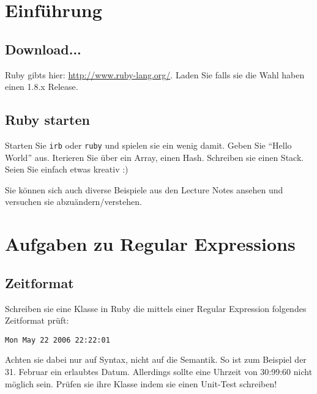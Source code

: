 \documentclass[a4paper,11pt,oneside]{scrbook}
\begin{document}
\renewcommand{\theequation}{\thesection.\arabic}
\setcapindent*{1em}


\chapter{Einführung} %
\label{cha:einführung}
\section{Download...} %
\label{sec:download_}
Ruby gibts hier: \url{http://www.ruby-lang.org/}. Laden Sie falls sie die Wahl haben einen 1.8.x Release.

\section{Ruby starten} %
\label{sec:ruby_starten}
Starten Sie \texttt{irb} oder \texttt{ruby} und spielen sie ein wenig damit. Geben Sie “Hello World” aus. Iterieren Sie über ein Array, einen Hash. Schreiben sie einen Stack. Seien Sie einfach etwas kreativ :)

Sie können sich auch diverse Beispiele aus den Lecture Notes ansehen und versuchen sie abzuändern/verstehen.


\chapter{Aufgaben zu Regular Expressions} %
\label{cha:aufgaben_zu_regular_expressions}

\section{Zeitformat} %
\label{sec:zeitformat}
Schreiben sie eine Klasse in Ruby die mittels einer Regular Expression folgendes Zeitformat prüft:

\begin{lstlisting}
Mon May 22 2006 22:22:01
\end{lstlisting}

Achten sie dabei nur auf Syntax, nicht auf die Semantik. So ist zum Beispiel der 31. Februar ein erlaubtes Datum. Allerdings sollte eine Uhrzeit von 30:99:60 nicht möglich sein.
Prüfen sie ihre Klasse indem sie einen Unit-Test schreiben!
\end{document}
